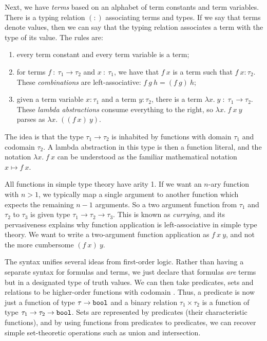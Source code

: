 Next, we have \emph{terms} based on an alphabet of term constants and term variables. There is a typing relation $(:)$ associating terms and types. If we say that terms denote values, then we can say that the typing relation associates a term with the type of its value. The rules are:
\begin{enumerate}
\item every term constant and every term variable is a term;
\item for terms $f\ :\ \tau_1\rightarrow\tau_2$ and $x\ :\ \tau_1$, we have that $f\ x$ is a term such that \mbox{$f\ x : \tau_2$}. These \emph{combinations} are left-associative: $f\ g\ h = (f\ g)\ h$;
\item given a term variable $x : \tau_1$ and a term $y : \tau_2$, there is a term $\lambda x.\;y\;:\;\tau_1 \rightarrow \tau_2$. These \emph{lambda abstractions} consume everything to the right, so $\lambda x.\; f\ x\ y$ parses as $\lambda x.\; ((f\ x)\ y)$.
\end{enumerate}

The idea is that the type $\tau_1 \rightarrow \tau_2$ is inhabited by functions with domain $\tau_1$ and codomain $\tau_2$. A lambda abstraction in this type is then a function literal, and the notation $\lambda x.\; f\ x$ can be understood as the familiar mathematical notation $x \mapsto f\ x$.

All functions in simple type theory have arity 1. If we want an $n$-ary function with \mbox{$n>1$}, we typically map a single argument to another function which expects the remaining $n-1$ arguments. So a two argument function from $\tau_1$ and $\tau_2$ to $\tau_3$ is given type $\tau_1 \rightarrow \tau_2 \rightarrow \tau_3$. This is known as \emph{currying}, and its pervasiveness explains why function application is left-associative in simple type theory. We want to write a two-argument function application as $f\ x\ y$, and not the more cumbersome $(f\ x)\ y$.

The syntax unifies several ideas from first-order logic. Rather than having a separate syntax for formulas and terms, we just declare that formulas \emph{are} terms but in a designated type  of truth values. We can then take predicates, sets and relations to be higher-order functions with codomain . Thus, a predicate is now just a function of type $\tau \rightarrow \texttt{bool}$ and a binary relation $\tau_1 \times \tau_2$ is a function of type $\tau_1 \rightarrow \tau_2 \rightarrow \texttt{bool}$. Sets are represented by predicates (their characteristic functions), and by using functions from predicates to predicates, we can recover simple set-theoretic operations such as union and intersection.

